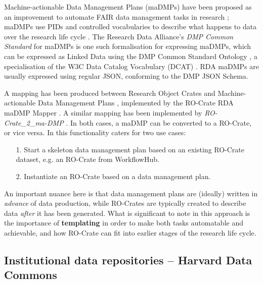 \documentclass[ds,v1.1.2,openaccess]{iosart2x}%
\begin{document}
Machine-actionable Data Management Plans (maDMPs) have been proposed as
an improvement to automate FAIR data management tasks in research
\cite{doi:10.1371/journal.pcbi.1006750}; maDMPs use PIDs and controlled
vocabularies to describe what happens to data over the research life
cycle \cite{doi:10.1007/978-3-030-45442-5_15}. The Research Data Alliance's
\textit{DMP Common Standard} for maDMPs \cite{doi:10.15497/rda00039} is one such
formalisation for expressing maDMPs, which can be expressed as Linked
Data using the DMP Common Standard Ontology
\cite{doi:10.4126/frl01-006423289}, a specialisation of the W3C Data
Catalog Vocabulary (DCAT) \cite{dcat2}. RDA maDMPs are usually expressed
using regular JSON, conforming to the DMP JSON Schema.

A mapping has been produced between Research Object Crates and
Machine-actionable Data Management Plans
\cite{doi:10.4126/frl01-006423291}, implemented by the RO-Crate RDA maDMP
Mapper \cite{doi:10.5281/zenodo.3922136}. A similar mapping has been
implemented by \textit{RO-Crate\_2\_ma-DMP} \cite{doi:10.5281/zenodo.3903463}. In
both cases, a maDMP can be converted to a RO-Crate, or vice versa. In
\cite{doi:10.4126/frl01-006423291} this functionality caters for two use cases:
\begin{enumerate}
\item[1.] Start a skeleton data management plan based on an existing RO-Crate
dataset, e.g. an RO-Crate from WorkflowHub.
\item[2.] Instantiate an RO-Crate based on a data management plan.
\end{enumerate}

An important nuance here is that data management plans are (ideally)
written in \textit{advance} of data production, while RO-Crates are typically
created to describe data \textit{after} it has been generated. What is
significant to note in this approach is the importance of
\textbf{templating} in order to make both tasks automatable and achievable,
and how RO-Crate can fit into earlier stages of the research life cycle.
\subsection{Institutional data repositories -- Harvard Data Commons}%

\label{sec:institutionalrepos}
\end{document}
